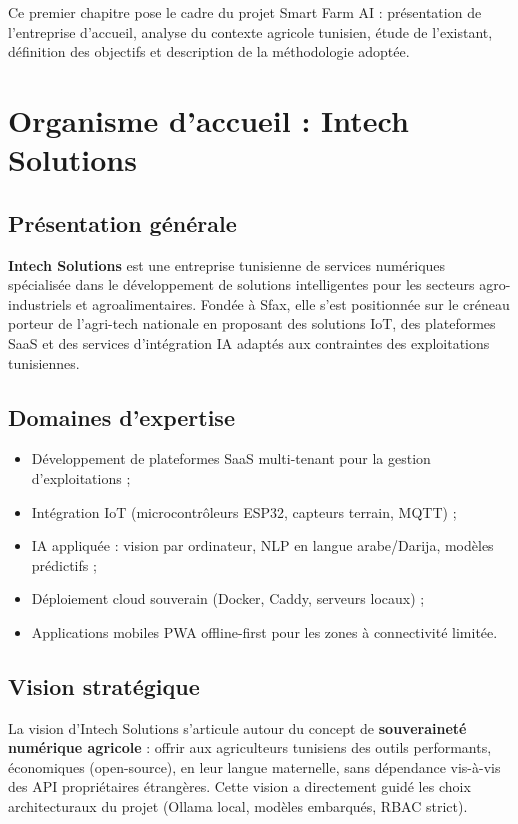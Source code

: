 \documentclass[12pt,a4paper,twoside]{report}
\newcounter{hi}
\begin{document}
Ce premier chapitre pose le cadre du projet Smart Farm AI : présentation
de l'entreprise d'accueil, analyse du contexte agricole tunisien, étude
de l'existant, définition des objectifs et description de la méthodologie
adoptée.

\section{Organisme d'accueil : Intech Solutions}

\subsection{Présentation générale}
\textbf{Intech Solutions} est une entreprise tunisienne de services numériques
spécialisée dans le développement de solutions intelligentes pour les secteurs
agro-industriels et agroalimentaires. Fondée à Sfax, elle s'est positionnée
sur le créneau porteur de l'agri-tech nationale en proposant des solutions
IoT, des plateformes SaaS et des services d'intégration IA adaptés aux
contraintes des exploitations tunisiennes.

\subsection{Domaines d'expertise}
\begin{itemize}
  \item Développement de plateformes SaaS multi-tenant pour la gestion d'exploitations ;
  \item Intégration IoT (microcontrôleurs ESP32, capteurs terrain, MQTT) ;
  \item IA appliquée : vision par ordinateur, NLP en langue arabe/Darija, modèles prédictifs ;
  \item Déploiement cloud souverain (Docker, Caddy, serveurs locaux) ;
  \item Applications mobiles PWA offline-first pour les zones à connectivité limitée.
\end{itemize}

\subsection{Vision stratégique}
La vision d'Intech Solutions s'articule autour du concept de
\textbf{souveraineté numérique agricole} : offrir aux agriculteurs tunisiens
des outils performants, économiques (open-source), en leur langue maternelle,
sans dépendance vis-à-vis des API propriétaires étrangères. Cette vision
a directement guidé les choix architecturaux du projet (Ollama local,
modèles embarqués, RBAC strict).
\end{document}
